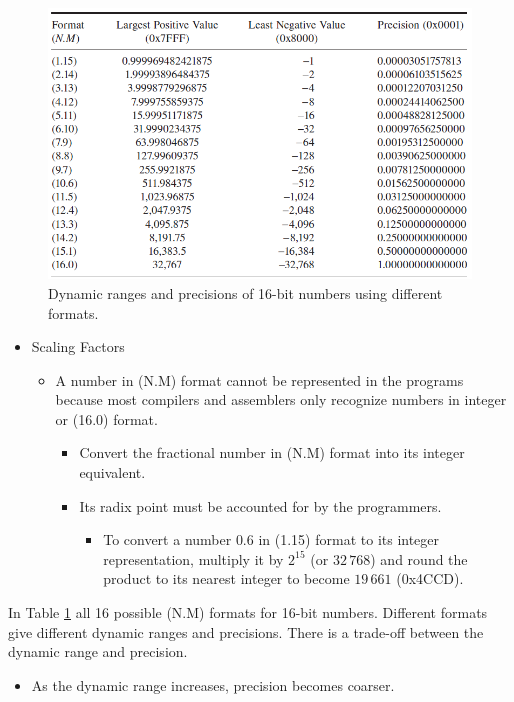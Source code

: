 \begin{figure} [H]
	\centering
	\includegraphics[width=\linewidth]{graphics/2.png}
	\caption{Dynamic ranges and precisions of 16-bit numbers using different formats.}
	\label{fig:2}
\end{figure}
\newpage
\begin{itemize}
	\item Scaling Factors
	\begin{itemize}
		\item A number in (N.M) format cannot be represented in the programs because most compilers and assemblers only recognize numbers in integer or (16.0) format. 
		\begin{itemize}
			\item Convert the fractional number in (N.M) format into its integer equivalent.
			\item Its radix point must be accounted for by the programmers.
			\begin{itemize}
				\item To convert a number $0.6$ in (1.15) format to its integer representation,
				multiply it by $2^{15}$ (or $32\,768$) and round the product to its nearest integer to
				become $19\,661$ (0x4CCD).
			\end{itemize}
		\end{itemize}
	\end{itemize}
\end{itemize}

\noindent\newline In Table \ref{fig:2} all 16 possible (N.M) formats for 16-bit numbers. Different formats give different dynamic ranges and precisions. There is a trade-off between the dynamic range and precision.
 \begin{itemize}
 	\item As the dynamic range increases, precision becomes	coarser.
 \end{itemize}
 


